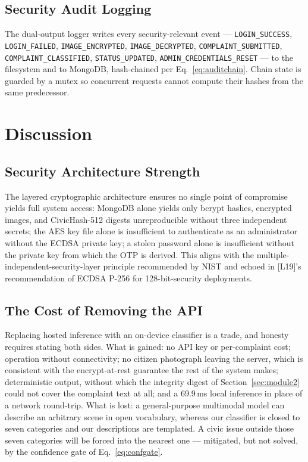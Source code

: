 \documentclass[conference]{IEEEtran}
\begin{document}
\subsection{Security Audit Logging}
The dual-output logger writes every security-relevant event --- \texttt{LOGIN\_SUCCESS}, \texttt{LOGIN\_FAILED}, \texttt{IMAGE\_ENCRYPTED}, \texttt{IMAGE\_DECRYPTED}, \texttt{COMPLAINT\_SUBMITTED}, \texttt{COMPLAINT\_CLASSIFIED}, \texttt{STATUS\_UPDATED}, \texttt{ADMIN\_CREDENTIALS\_RESET} --- to the filesystem and to MongoDB, hash-chained per Eq.~\ref{eq:auditchain}. Chain state is guarded by a mutex so concurrent requests cannot compute their hashes from the same predecessor.

\section{Discussion}

\subsection{Security Architecture Strength}
The layered cryptographic architecture ensures no single point of compromise yields full system access: MongoDB alone yields only bcrypt hashes, encrypted images, and CivicHash-512 digests unreproducible without three independent secrets; the AES key file alone is insufficient to authenticate as an administrator without the ECDSA private key; a stolen password alone is insufficient without the private key from which the OTP is derived. This aligns with the multiple-independent-security-layer principle recommended by NIST \cite{grassi2017nist} and echoed in [L19]'s recommendation of ECDSA P-256 for 128-bit-security deployments.

\subsection{The Cost of Removing the API}
Replacing hosted inference with an on-device classifier is a trade, and honesty requires stating both sides. What is gained: no API key or per-complaint cost; operation without connectivity; no citizen photograph leaving the server, which is consistent with the encrypt-at-rest guarantee the rest of the system makes; deterministic output, without which the integrity digest of Section~\ref{sec:module2} could not cover the complaint text at all; and a 69.9\,ms local inference in place of a network round-trip. What is lost: a general-purpose multimodal model can describe an arbitrary scene in open vocabulary, whereas our classifier is closed to seven categories and our descriptions are templated. A civic issue outside those seven categories will be forced into the nearest one --- mitigated, but not solved, by the confidence gate of Eq.~\ref{eq:confgate}.
\end{document}
